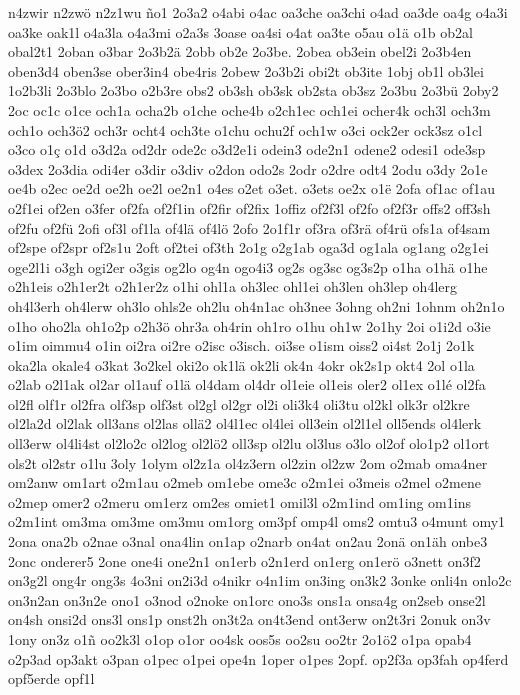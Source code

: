 {n4zwir
n2zwö
n2z1wu
ño1
2o3a2
o4abi
o4ac
oa3che
oa3chi
o4ad
oa3de
oa4g
o4a3i
oa3ke
oak1l
o4a3la
o4a3mi
o2a3s
3oase
oa4si
o4at
oa3te
o5au
o1ä
o1b
ob2al
obal2t1
2oban
o3bar
2o3b2ä
2obb
ob2e
2o3be.
2obea
ob3ein
obel2i
2o3b4en
oben3d4
oben3se
ober3in4
obe4ris
2obew
2o3b2i
obi2t
ob3ite
1obj
ob1l
ob3lei
1o2b3li
2o3blo
2o3bo
o2b3re
obs2
ob3sh
ob3sk
ob2sta
ob3sz
2o3bu
2o3bü
2oby2
2oc
oc1c
o1ce
och1a
ocha2b
o1che
oche4b
o2ch1ec
och1ei
ocher4k
och3l
och3m
och1o
och3ö2
och3r
ocht4
och3te
o1chu
ochu2f
och1w
o3ci
ock2er
ock3sz
o1cl
o3co
o1ç
o1d
o3d2a
od2dr
ode2c
o3d2e1i
odein3
ode2n1
odene2
odesi1
ode3sp
o3dex
2o3dia
odi4er
o3dir
o3div
o2don
odo2s
2odr
o2dre
odt4
2odu
o3dy
2o1e
oe4b
o2ec
oe2d
oe2h
oe2l
oe2n1
o4es
o2et
o3et.
o3ets
oe2x
o1ë
2ofa
of1ac
of1au
o2f1ei
of2en
o3fer
of2fa
of2f1in
of2fir
of2fix
1offiz
of2f3l
of2fo
of2f3r
offs2
off3sh
of2fu
of2fü
2ofi
of3l
of1la
of4lä
of4lö
2ofo
2o1f1r
of3ra
of3rä
of4rü
ofs1a
of4sam
of2spe
of2spr
of2s1u
2oft
of2tei
of3th
2o1g
o2g1ab
oga3d
og1ala
og1ang
o2g1ei
oge2l1i
o3gh
ogi2er
o3gis
og2lo
og4n
ogo4i3
og2s
og3sc
og3s2p
o1ha
o1hä
o1he
o2h1eis
o2h1er2t
o2h1er2z
o1hi
ohl1a
oh3lec
ohl1ei
oh3len
oh3lep
oh4lerg
oh4l3erh
oh4lerw
oh3lo
ohls2e
oh2lu
oh4n1ac
oh3nee
3ohng
oh2ni
1ohnm
oh2n1o
o1ho
oho2la
oh1o2p
o2h3ö
ohr3a
oh4rin
oh1ro
o1hu
oh1w
2o1hy
2oi
o1i2d
o3ie
o1im
oimmu4
o1in
oi2ra
oi2re
o2isc
o3isch.
oi3se
o1ism
oiss2
oi4st
2o1j
2o1k
oka2la
okale4
o3kat
3o2kel
oki2o
ok1lä
ok2li
ok4n
4okr
ok2s1p
okt4
2ol
o1la
o2lab
o2l1ak
ol2ar
ol1auf
o1lä
ol4dam
ol4dr
ol1eie
ol1eis
oler2
ol1ex
o1lé
ol2fa
ol2fl
olf1r
ol2fra
olf3sp
olf3st
ol2gl
ol2gr
ol2i
oli3k4
oli3tu
ol2kl
olk3r
ol2kre
ol2la2d
ol2lak
oll3ans
ol2las
ollä2
ol4l1ec
ol4lei
oll3ein
ol2l1el
oll5ends
ol4lerk
oll3erw
ol4li4st
ol2lo2c
ol2log
ol2lö2
oll3sp
ol2lu
ol3lus
o3lo
ol2of
olo1p2
ol1ort
ols2t
ol2str
o1lu
3oly
1olym
ol2z1a
ol4z3ern
ol2zin
ol2zw
2om
o2mab
oma4ner
om2anw
om1art
o2m1au
o2meb
om1ebe
ome3c
o2m1ei
o3meis
o2mel
o2mene
o2mep
omer2
o2meru
om1erz
om2es
omiet1
omil3l
o2m1ind
om1ing
om1ins
o2m1int
om3ma
om3me
om3mu
om1org
om3pf
omp4l
oms2
omtu3
o4munt
omy1
2ona
ona2b
o2nae
o3nal
ona4lin
on1ap
o2narb
on4at
on2au
2onä
on1äh
onbe3
2onc
onderer5
2one
one4i
one2n1
on1erb
o2n1erd
on1erg
on1erö
o3nett
on3f2
on3g2l
ong4r
ong3s
4o3ni
on2i3d
o4nikr
o4n1im
on3ing
on3k2
3onke
onli4n
onlo2c
on3n2an
on3n2e
ono1
o3nod
o2noke
on1orc
ono3s
ons1a
onsa4g
on2seb
onse2l
on4sh
onsi2d
ons3l
ons1p
onst2h
on3t2a
on4t3end
ont3erw
on2t3ri
2onuk
on3v
1ony
on3z
o1ñ
oo2k3l
o1op
o1or
oo4sk
oos5s
oo2su
oo2tr
2o1ö2
o1pa
opab4
o2p3ad
op3akt
o3pan
o1pec
o1pei
ope4n
1oper
o1pes
2opf.
op2f3a
op3fah
op4ferd
opf5erde
opf1l
}
